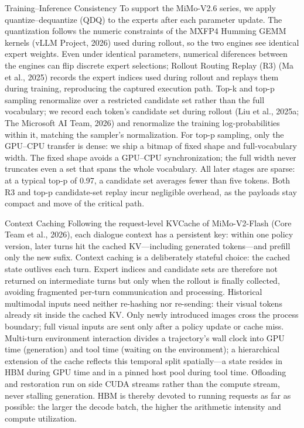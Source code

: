 \documentclass[
  10
]{article}
\begin{document}
Training--Inference Consistency To support the MiMo-V2.6 series, we
apply quantize--dequantize (QDQ) to the experts after each parameter
update. The quantization follows the numeric constraints of the MXFP4
Humming GEMM kernels (vLLM Project, 2026) used during rollout, so the
two engines see identical expert weights. Even under identical
parameters, numerical diferences between the engines can flip discrete
expert selections; Rollout Routing Replay (R3) (Ma et al., 2025) records
the expert indices used during rollout and replays them during training,
reproducing the captured execution path. Top-k and top-p sampling
renormalize over a restricted candidate set rather than the full
vocabulary; we record each token's candidate set during rollout (Liu et
al., 2025a; The Microsoft AI Team, 2026) and renormalize the training
log-probabilities within it, matching the sampler's normalization. For
top-p sampling, only the GPU--CPU transfer is dense: we ship a bitmap of
fixed shape and full-vocabulary width. The fixed shape avoids a GPU--CPU
synchronization; the full width never truncates even a set that spans
the whole vocabulary. All later stages are sparse: at a typical top-p of
0.97, a candidate set averages fewer than five tokens. Both R3 and top-p
candidate-set replay incur negligible overhead, as the payloads stay
compact and move of the critical path.

Context Caching Following the request-level KVCache of MiMo-V2-Flash
(Core Team et al., 2026), each dialogue context has a persistent key:
within one policy version, later turns hit the cached KV---including
generated tokens---and prefill only the new sufix. Context caching is a
deliberately stateful choice: the cached state outlives each turn.
Expert indices and candidate sets are therefore not returned on
intermediate turns but only when the rollout is finally collected,
avoiding fragmented per-turn communication and processing. Historical
multimodal inputs need neither re-hashing nor re-sending: their visual
tokens already sit inside the cached KV. Only newly introduced images
cross the process boundary; full visual inputs are sent only after a
policy update or cache miss. Multi-turn environment interaction divides
a trajectory's wall clock into GPU time (generation) and tool time
(waiting on the environment); a hierarchical extension of the cache
reflects this temporal split spatially---a state resides in HBM during
GPU time and in a pinned host pool during tool time. Ofloading and
restoration run on side CUDA streams rather than the compute stream,
never stalling generation. HBM is thereby devoted to running requests as
far as possible: the larger the decode batch, the higher the arithmetic
intensity and compute utilization.
\end{document}
